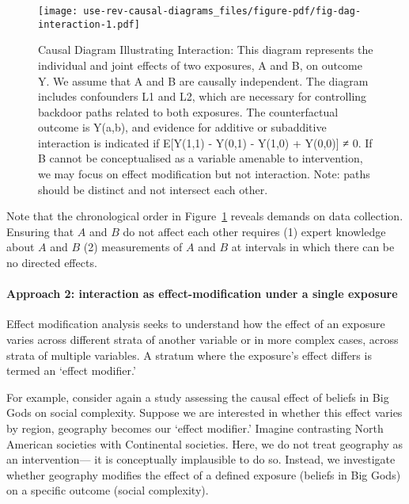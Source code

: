 \documentclass[
  singlecolumn,
  9pt]{article}
\let\oldparagraph\paragraph
\renewcommand{\paragraph}[1]{\oldparagraph{#1}\mbox{}}
\begin{document}
\begin{figure}

{\centering \texttt{[image: use-rev-causal-diagrams\_files/figure-pdf/fig-dag-interaction-1.pdf]}

}

\caption{\label{fig-dag-interaction}Causal Diagram Illustrating
Interaction: This diagram represents the individual and joint effects of
two exposures, A and B, on outcome Y. We assume that A and B are
causally independent. The diagram includes confounders L1 and L2, which
are necessary for controlling backdoor paths related to both exposures.
The counterfactual outcome is Y(a,b), and evidence for additive or
subadditive interaction is indicated if E{[}Y(1,1) - Y(0,1) - Y(1,0) +
Y(0,0){]} ≠ 0. If B cannot be conceptualised as a variable amenable to
intervention, we may focus on effect modification but not interaction.
Note: paths should be distinct and not intersect each other.}

\end{figure}

Note that the chronological order in Figure~\ref{fig-dag-interaction}
reveals demands on data collection. Ensuring that \(A\) and \(B\) do not
affect each other requires (1) expert knowledge about \(A\) and \(B\)
(2) measurements of \(A\) and \(B\) at intervals in which there can be
no directed effects.

\paragraph{Approach 2: interaction as effect-modification under a single
exposure}\label{approach-2-interaction-as-effect-modification-under-a-single-exposure}

Effect modification analysis seeks to understand how the effect of an
exposure varies across different strata of another variable or in more
complex cases, across strata of multiple variables. A stratum where the
exposure's effect differs is termed an `effect modifier.'

For example, consider again a study assessing the causal effect of
beliefs in Big Gods on social complexity. Suppose we are interested in
whether this effect varies by region, geography becomes our `effect
modifier.' Imagine contrasting North American societies with Continental
societies. Here, we do not treat geography as an intervention--- it is
conceptually implausible to do so. Instead, we investigate whether
geography modifies the effect of a defined exposure (beliefs in Big
Gods) on a specific outcome (social complexity).
\end{document}
